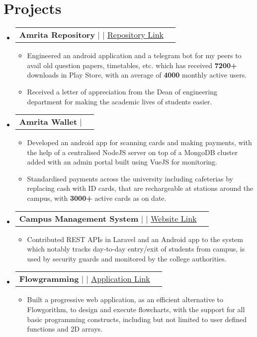 \documentclass[letterpaper,11pt]{article}
\makeatletter
\newcommand{\resumeItem}[1]{
  \item\small{
    {#1 \vspace{-2pt}}
  }
}
\newcommand{\resumeProjectHeading}[2]{
    \item
    \begin{tabular*}{1.001\textwidth}{l@{\extracolsep{\fill}}r}
      \small#1 & \textbf{\small #2}\\
    \end{tabular*}\vspace{-7pt}
}
\newcommand{\resumeSubHeadingListStart}{\begin{itemize}[leftmargin=0.0in, label={}]}
\newcommand{\resumeSubHeadingListEnd}{\end{itemize}}
\newcommand{\resumeItemListStart}{\begin{itemize}}
\newcommand{\resumeItemListEnd}{\end{itemize}\vspace{-5pt}}
\makeatother
\begin{document}
\section{Projects}
    \vspace{-5pt}
    \resumeSubHeadingListStart
      \resumeProjectHeading
          {\textbf{Amrita Repository} $|$ \text{Android, SQLite, Web Scraping, PHP} $|$ \href{https://github.com/rajkumaar23/amrita-repository}{\underline {Repository Link}}}{}
          \resumeItemListStart
            \resumeItem{Engineered an android application and a telegram bot for my peers to avail old question papers, timetables,  etc.  which has received \textbf{7200+} downloads in Play Store,  with an average of \textbf{4000} monthly active users.}
            \resumeItem{Received a letter of appreciation from the Dean of engineering department for making the academic lives of students easier.}
          \resumeItemListEnd
          \vspace{-13pt}
      \resumeProjectHeading
          {\textbf{Amrita Wallet} $|$ \text{Android, NodeJS, MongoDB, jQuery, PM2}}{}
          \resumeItemListStart
            \resumeItem{Developed an android app for scanning cards and making payments,  with the help of a centralised NodeJS server on top of a MongoDB cluster added with an admin portal built using VueJS for monitoring.}          
            \resumeItem{Standardised payments across the university including cafeterias by replacing cash with ID cards,  that are rechargeable at stations around the campus,  with \textbf{3000+} active cards as on date.}
          \resumeItemListEnd 
          \vspace{-13pt}
          \resumeProjectHeading
          {\textbf{Campus Management System} $|$ \text{PHP, Laravel, MySQL, Android} $|$ \href{https://cms.cb.amrita.edu/humans.txt}{\underline{Website Link}}}{}
          \resumeItemListStart
            \resumeItem{Contributed REST APIs in Laravel and an Android app to the system which notably tracks day-to-day entry/exit of students from campus,  is used by security guards and monitored by the college authorities.}
          \resumeItemListEnd 
          \vspace{-13pt}
          \resumeProjectHeading
          {\textbf{Flowgramming} $|$ \text{HTML, Bootstrap, jQuery,  JointJS} $|$ \href{https://adoring-leakey-ec5a88.netlify.app/}{\underline{Application Link}}}{}
          \resumeItemListStart
            \resumeItem{Built a progressive web application,  as an efficient alternative to Flowgorithm,  to design and execute flowcharts,  with the support for all basic programming constructs,  including but not limited to user defined functions and 2D arrays.}
          \resumeItemListEnd 
    \resumeSubHeadingListEnd
\vspace{-15pt}
\end{document}
